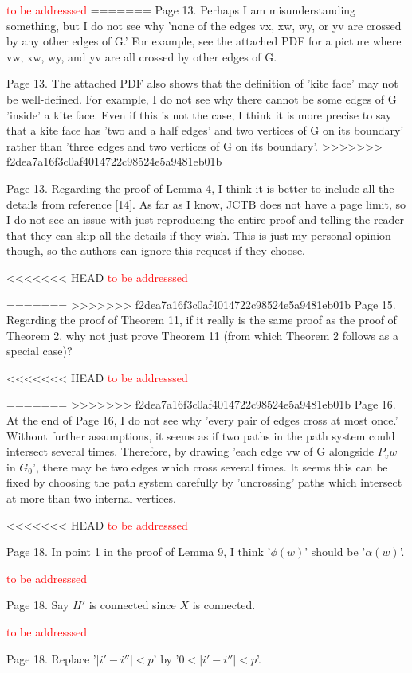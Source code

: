 \documentclass[12pt]{article}
\newcommand{\tba}{\textcolor{red}{to be addresssed}}
\begin{document}
\tba
=======
Page 13. Perhaps I am misunderstanding something, but I do not see why
'none of the edges vx, xw, wy, or yv are crossed by any other edges of
G.'  For example, see the attached PDF for a picture where vw, xw, wy,
and yv are all crossed by other edges of G.

Page 13. The attached PDF also shows that the definition of 'kite
face' may not be well-defined.  For example, I do not see why there
cannot be some edges of G 'inside' a kite face.  Even if this is not
the case, I think it is more precise to say that a kite face has 'two
and a half edges' and two vertices of G on its boundary' rather than
'three edges and two vertices of G on its boundary'.
>>>>>>> f2dea7a16f3c0af4014722c98524e5a9481eb01b

Page 13.  Regarding the proof of Lemma 4, I think it is better to
include all the details from reference [14].  As far as I know, JCTB
does not have a page limit, so I do not see an issue with just
reproducing the entire proof and telling the reader that they can skip
all the details if they wish.  This is just my personal opinion
though, so the authors can ignore this request if they choose.

<<<<<<< HEAD
\tba

=======
>>>>>>> f2dea7a16f3c0af4014722c98524e5a9481eb01b
Page 15. Regarding the proof of Theorem 11, if it really is the same
proof as the proof of Theorem 2, why not just prove Theorem 11 (from
which Theorem 2 follows as a special case)?

<<<<<<< HEAD
\tba

=======
>>>>>>> f2dea7a16f3c0af4014722c98524e5a9481eb01b
Page 16.  At the end of Page 16, I do not see why 'every pair of edges
cross at most once.'  Without further assumptions, it seems as if two
paths in the path system could intersect several times.  Therefore, by
drawing 'each edge vw of G alongside $P_vw$ in $G_0$', there may be two
edges which cross several times.  It seems this can be fixed by
choosing the path system carefully by 'uncrossing' paths which
intersect at more than two internal vertices.

<<<<<<< HEAD
\tba

Page 18. In point 1 in the proof of Lemma 9, I think '$\phi(w)$' should
be '$\alpha(w)$'.

\tba

Page 18.  Say $H'$ is connected since $X$ is connected.

\tba

Page 18.  Replace '$|i'-i''| < p$' by  '$0< |i'-i''| < p$'.
\end{document}
